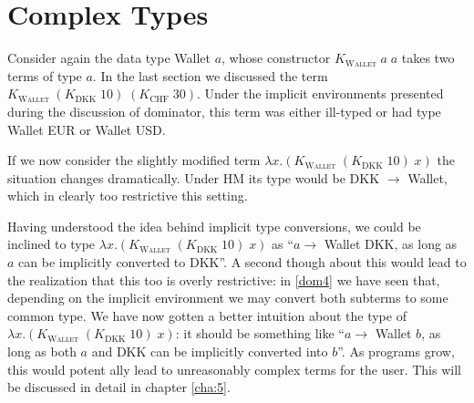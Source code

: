 \section{Complex Types}
\label{complex types}
Consider again the data type Wallet $a$, whose constructor \textsc{$K_{\text{Wallet}} \;a \; a$} takes two terms of type $a$. In the last section we discussed the term \textsc{$K_{\text{Wallet}}\;(K_{\text{DKK}}\;10)\;(K_{\text{CHF}}\;30)$}. Under the implicit environments presented during the discussion of dominator, this term was either ill-typed or had type Wallet EUR or Wallet USD.

If we now consider the slightly modified term \textsc{$\lambda x. (K_{\text{Wallet}}\;(K_{\text{DKK}}\;10)\;x)$} the situation changes dramatically. Under HM its type would be DKK $\to$ Wallet, which in clearly too restrictive this setting.

Having understood the idea behind implicit type conversions, we could be inclined to type \textsc{$\lambda x. (K_{\text{Wallet}}\;(K_{\text{DKK}}\;10)\;x)$} as ``$a \to$ Wallet DKK, as long as $a$ can be implicitly converted to DKK''. A second though about this would lead to the realization that this too is overly restrictive: in \ref{dom4} we have seen that, depending on the implicit environment we may convert both subterms to some common type. We have now gotten a better intuition about the type of \textsc{$\lambda x. (K_{\text{Wallet}}\;(K_{\text{DKK}}\;10)\;x)$}: it should be something like ``$a \to$ Wallet $b$, as long as both $a$ and DKK can be implicitly converted into $b$''. As programs grow, this would potent ally lead to unreasonably complex terms for the user. This will be discussed in detail in chapter \ref{cha:5}.


